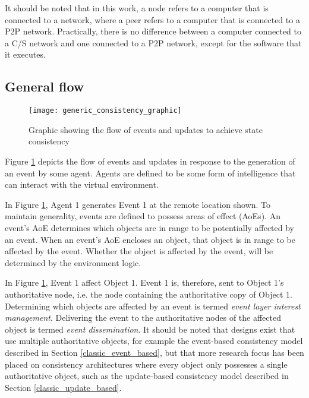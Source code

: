 It should be noted that in this work, a node refers to a computer that is connected to a network, where a peer refers to a computer that is connected to a P2P network. Practically, there is no difference between a computer connected to a C/S network and one connected to a P2P network, except for the software that it executes.

\subsection{General flow}
\label{general_flow}

\begin{figure}[htbp]
 \centering
 \texttt{[image: generic\_consistency\_graphic]}
 \caption{Graphic showing the flow of events and updates to achieve state consistency}
 \label{fig_event_update_flow_graphic}
\end{figure}

Figure \ref{fig_event_update_flow_graphic} depicts the flow of events and updates in response to the generation of an event by some agent. Agents are defined to be some form of intelligence that can interact with the virtual environment.

In Figure \ref{fig_event_update_flow_graphic}, Agent 1 generates Event 1 at the remote location shown. To maintain generality, events are defined to possess areas of effect (AoEs). An event's AoE determines which objects are in range to be potentially affected by an event. When an event's AoE encloses an object, that object is in range to be affected by the event. Whether the object is affected by the event, will be determined by the environment logic.

In Figure \ref{fig_event_update_flow_graphic}, Event 1 affect Object 1. Event 1 is, therefore, sent to Object 1's authoritative node, i.e. the node containing the authoritative copy of Object 1. Determining which objects are affected by an event is termed \emph{event layer interest management}. Delivering the event to the authoritative nodes of the affected object is termed \emph{event dissemination}. It should be noted that designs exist that use multiple authoritative objects, for example the event-based consistency model described in Section \ref{classic_event_based}, but that more research focus has been placed on consistency architectures where every object only possesses a single authoritative object, such as the update-based consistency model described in Section \ref{classic_update_based}.

